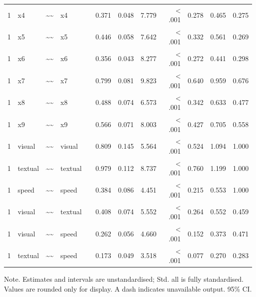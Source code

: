 \documentclass[11pt]{article}
\begin{document}
\begin{landscape}
\begin{longtable}{llllrrrrrrrr}
1 & x4 & \textasciitilde{}\textasciitilde{} & x4 &  & 0.371 & 0.048 & 7.779 & < .001 & 0.278 & 0.465 & 0.275 \\
1 & x5 & \textasciitilde{}\textasciitilde{} & x5 &  & 0.446 & 0.058 & 7.642 & < .001 & 0.332 & 0.561 & 0.269 \\
1 & x6 & \textasciitilde{}\textasciitilde{} & x6 &  & 0.356 & 0.043 & 8.277 & < .001 & 0.272 & 0.441 & 0.298 \\
1 & x7 & \textasciitilde{}\textasciitilde{} & x7 &  & 0.799 & 0.081 & 9.823 & < .001 & 0.640 & 0.959 & 0.676 \\
1 & x8 & \textasciitilde{}\textasciitilde{} & x8 &  & 0.488 & 0.074 & 6.573 & < .001 & 0.342 & 0.633 & 0.477 \\
1 & x9 & \textasciitilde{}\textasciitilde{} & x9 &  & 0.566 & 0.071 & 8.003 & < .001 & 0.427 & 0.705 & 0.558 \\
1 & visual & \textasciitilde{}\textasciitilde{} & visual &  & 0.809 & 0.145 & 5.564 & < .001 & 0.524 & 1.094 & 1.000 \\
1 & textual & \textasciitilde{}\textasciitilde{} & textual &  & 0.979 & 0.112 & 8.737 & < .001 & 0.760 & 1.199 & 1.000 \\
1 & speed & \textasciitilde{}\textasciitilde{} & speed &  & 0.384 & 0.086 & 4.451 & < .001 & 0.215 & 0.553 & 1.000 \\
1 & visual & \textasciitilde{}\textasciitilde{} & textual &  & 0.408 & 0.074 & 5.552 & < .001 & 0.264 & 0.552 & 0.459 \\
1 & visual & \textasciitilde{}\textasciitilde{} & speed &  & 0.262 & 0.056 & 4.660 & < .001 & 0.152 & 0.373 & 0.471 \\
1 & textual & \textasciitilde{}\textasciitilde{} & speed &  & 0.173 & 0.049 & 3.518 & < .001 & 0.077 & 0.270 & 0.283 \\
\bottomrule
\end{longtable}
\noindent Note. Estimates and intervals are unstandardised; Std. all is fully standardised. Values are rounded only for display. A dash indicates unavailable output. 95\% CI. \par
\end{landscape}
\end{document}
